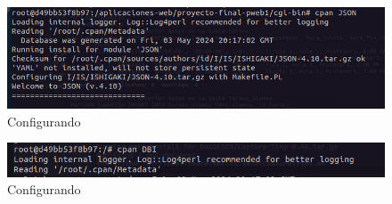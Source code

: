 \begin{figure}[H]
  \centering
  \includegraphics[width=1.0\textwidth]{img/Modulo_JSON.png}
  \caption{Configurando}
\end{figure}
\begin{figure}[H]
  \centering
  \includegraphics[width=1.0\textwidth]{img/Instalador_DBI.png}
  \caption{Configurando}
\end{figure}

